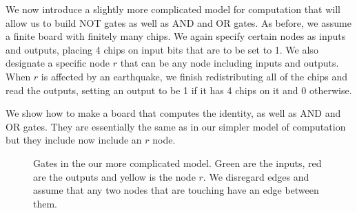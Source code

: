 \documentclass[runningheads,a4paper]{llncs}
\begin{document}
We now introduce a slightly more complicated model for computation that will allow us to build NOT gates as well as AND and OR gates. As before, we assume a finite board with finitely many chips. We again specify certain nodes as  inputs and outputs, placing 4 chips on input bits that are to be set to 1. We also designate a specific node $r$ that can be any node including inputs and outputs. When $r$ is affected by an earthquake, we finish redistributing all of the chips and read the outputs, setting an output to be 1 if it has 4 chips on it and 0 otherwise. 

We show how to make a board that computes the identity, as well as AND and OR gates. They are essentially the same as in our simpler model of computation but they include now include an $r$ node.

\begin{figure}
\centering
{}
\qquad\qquad
{}
\qquad\qquad
{}
\caption{Gates in the our more complicated model. Green are the inputs, red are the outputs and yellow is the node $r$. We disregard edges and assume that any two nodes that are touching have an edge between them.}
\label{fig:simplegateswithr}
\end{figure}


\end{document}
